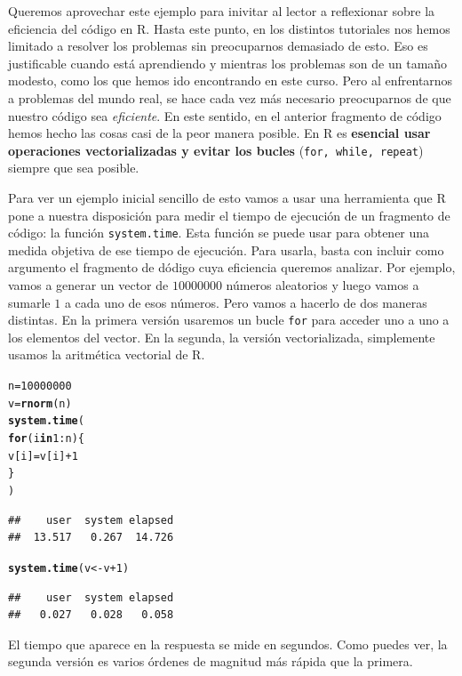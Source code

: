 \documentclass[10pt,a4paper]{article}\usepackage[]{graphicx}\usepackage[]{color}
\makeatletter
\newcommand{\hlnum}[1]{\textcolor[rgb]{0.686,0.059,0.569}{#1}}%
\newcommand{\hlopt}[1]{\textcolor[rgb]{0,0,0}{#1}}%
\newcommand{\hlstd}[1]{\textcolor[rgb]{0.345,0.345,0.345}{#1}}%
\newcommand{\hlkwa}[1]{\textcolor[rgb]{0.161,0.373,0.58}{\textbf{#1}}}%
\newcommand{\hlkwb}[1]{\textcolor[rgb]{0.69,0.353,0.396}{#1}}%
\newcommand{\hlkwd}[1]{\textcolor[rgb]{0.737,0.353,0.396}{\textbf{#1}}}%
\newenvironment{kframe}{%
 \def\at@end@of@kframe{}%
 \ifinner\ifhmode%
  \def\at@end@of@kframe{\end{minipage}}%
  \begin{minipage}{\columnwidth}%
 \fi\fi%
 \def\FrameCommand##1{\hskip\@totalleftmargin \hskip-\fboxsep
 \colorbox{shadecolor}{##1}\hskip-\fboxsep
     \hskip-\linewidth \hskip-\@totalleftmargin \hskip\columnwidth}%
 \MakeFramed {\advance\hsize-\width
   \@totalleftmargin\z@ \linewidth\hsize
   \@setminipage}}%
 {\par\unskip\endMakeFramed%
 \at@end@of@kframe}
\newenvironment{knitrout}{}{} %
\newcounter {cont01}
\makeatother
\begin{document}
Queremos aprovechar este ejemplo para inivitar al lector a reflexionar sobre la eficiencia del código en R. Hasta este punto, en los distintos tutoriales nos hemos limitado a resolver los problemas sin preocuparnos demasiado de esto. Eso es justificable cuando está aprendiendo y mientras los problemas son de un tamaño modesto, como los que hemos ido encontrando en este curso. Pero al enfrentarnos a problemas del mundo real, se hace cada vez más necesario preocuparnos de que nuestro código sea {\em eficiente}. En este sentido, en el anterior fragmento de código hemos hecho las cosas casi de la peor manera posible. En R es {\bf esencial usar operaciones vectorializadas y evitar los bucles} ({\tt for, while, repeat}) siempre que sea posible.

Para ver un ejemplo inicial sencillo de esto vamos a usar una herramienta que R pone a nuestra disposición para medir el tiempo de ejecución de un fragmento de código: la función {\tt system.time}. Esta función se puede usar para obtener una medida objetiva de ese tiempo de ejecución. Para usarla, basta con incluir como argumento el fragmento de dódigo cuya eficiencia queremos analizar. Por ejemplo, vamos a generar un vector de $10000000$ números aleatorios y luego vamos a sumarle $1$ a cada uno de esos números. Pero vamos a hacerlo de dos maneras distintas. En la primera versión usaremos un bucle {\tt for} para acceder uno a uno a los elementos del vector. En la segunda, la versión vectorializada, simplemente usamos la aritmética vectorial de R.
\begin{knitrout}
\color{fgcolor}\begin{kframe}
\begin{alltt}
\hlstd{n} \hlkwb{=} \hlnum{10000000}
\hlstd{v} \hlkwb{=} \hlkwd{rnorm}\hlstd{(n)}
\hlkwd{system.time}\hlstd{(}
  \hlkwa{for} \hlstd{(i} \hlkwa{in} \hlnum{1}\hlopt{:}\hlstd{n)\{}
    \hlstd{v[i]} \hlkwb{=} \hlstd{v[i]} \hlopt{+} \hlnum{1}
  \hlstd{\}}
\hlstd{)}
\end{alltt}
\begin{verbatim}
##    user  system elapsed 
##  13.517   0.267  14.726
\end{verbatim}
\begin{alltt}
\hlkwd{system.time}\hlstd{(v} \hlkwb{<-} \hlstd{v} \hlopt{+}\hlnum{1}\hlstd{)}
\end{alltt}
\begin{verbatim}
##    user  system elapsed 
##   0.027   0.028   0.058
\end{verbatim}
\end{kframe}
\end{knitrout}
El tiempo que aparece en la respuesta se mide en segundos. Como puedes ver, la segunda versión es varios órdenes de magnitud más rápida que la primera.
\end{document}
